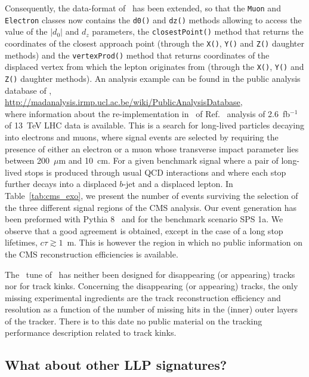 Consequently, the data-format of \MA\ has been extended, so that the \verb+Muon+ and
\verb+Electron+ classes now contains the \verb+d0()+ and \verb+dz()+ methods allowing to
access the value of the $|d_0|$ and $d_z$ parameters, the \verb+closestPoint()+
method that returns the coordinates of the closest approach point (through the
\verb+X()+, \verb+Y()+ and \verb+Z()+ daughter methods) and the
\verb+vertexProd()+ method that returns coordinates of the displaced vertex from
which the lepton originates from (through the \verb+X()+, \verb+Y()+ and
\verb+Z()+ daughter methods). An analysis example \cite{MA5:longlivedleptons} can be found in the public analysis database of \MA,\\
\noindent \url{http://madanalysis.irmp.ucl.ac.be/wiki/PublicAnalysisDatabase},\\
\noindent where information about the re-implementation in \MA\ of Ref.~\cite{CMS-PAS-EXO-16-022}  
analysis of 2.6~fb$^{-1}$ of 13~TeV LHC data is available. This is a search for long-lived particles decaying into electrons and muons, where signal
events are selected by requiring the presence of either an electron or a muon
whose transverse impact parameter lies between 200~$\mu$m and 10~cm. For a given
benchmark signal where a pair of long-lived stops is produced through usual QCD
interactions and where each stop further decays into a displaced $b$-jet and a
displaced lepton. In Table~\ref{tab:cms_exo}, we present the number of events
surviving the selection of the three different signal regions of the CMS analysis.
Our event generation has been preformed with {\sc Pythia} 8~\cite{Sjostrand:2007gs}
and for the benchmark
scenario SPS 1a.
We observe that a good agreement is obtained, except in the case of a long stop
lifetimes, $c\tau \gtrsim 1$~m. 
This is however the region in which no public information on
the CMS reconstruction efficiencies is available.

The \MA\ tune of \DEL\ has neither been designed for disappearing
(or appearing) tracks nor for track kinks. Concerning the disappearing (or appearing)
tracks, the only missing experimental ingredients are the track reconstruction efficiency
and resolution as a function of the number of missing hits in the (inner) outer
layers of the tracker. There is to this date no public material on the tracking
performance description related to track kinks.

\subsection{What about other LLP signatures?}

